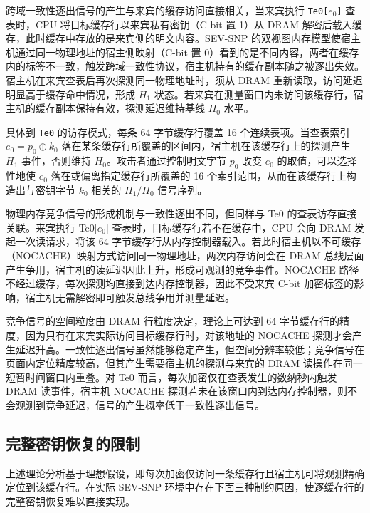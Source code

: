 跨域一致性逐出信号的产生与来宾的缓存访问直接相关，当来宾执行 \texttt{Te0[$e_0$]} 查表时，CPU 将目标缓存行以来宾私有密钥（C-bit 置 1）从 DRAM 解密后载入缓存，此时缓存中存放的是来宾侧的明文内容。SEV-SNP 的双视图内存模型使宿主机通过同一物理地址的宿主侧映射（C-bit 置 0）看到的是不同内容，两者在缓存内的标签不一致，触发跨域一致性协议，宿主机持有的缓存副本随之被逐出失效。宿主机在来宾查表后再次探测同一物理地址时，须从 DRAM 重新读取，访问延迟明显高于缓存命中情况，形成 $H_1$ 状态。若来宾在测量窗口内未访问该缓存行，宿主机的缓存副本保持有效，探测延迟维持基线 $H_0$ 水平。

具体到 \texttt{Te0} 的访存模式，每条 64 字节缓存行覆盖 16 个连续表项。当查表索引 $e_0 = p_0 \oplus k_0$ 落在某条缓存行所覆盖的区间内，宿主机在该缓存行上的探测产生 $H_1$ 事件，否则维持 $H_0$。攻击者通过控制明文字节 $p_0$ 改变 $e_0$ 的取值，可以选择性地使 $e_0$ 落在或偏离指定缓存行所覆盖的 16 个索引范围，从而在该缓存行上构造出与密钥字节 $k_0$ 相关的 $H_1/H_0$ 信号序列。

物理内存竞争信号的形成机制与一致性逐出不同，但同样与 Te0 的查表访存直接关联。来宾执行 Te0[$e_0$] 查表时，目标缓存行若不在缓存中，CPU 会向 DRAM 发起一次读请求，将该 64 字节缓存行从内存控制器载入。若此时宿主机以不可缓存（NOCACHE）映射方式访问同一物理地址，两次内存访问会在 DRAM 总线层面产生争用，宿主机的读延迟因此上升，形成可观测的竞争事件。NOCACHE 路径不经过缓存，每次探测均直接到达内存控制器，因此不受来宾 C-bit 加密标签的影响，宿主机无需解密即可触发总线争用并测量延迟。

竞争信号的空间粒度由 DRAM 行粒度决定，理论上可达到 64 字节缓存行的精度，因为只有在来宾实际访问目标缓存行时，对该地址的 NOCACHE 探测才会产生延迟升高。一致性逐出信号虽然能够稳定产生，但空间分辨率较低；竞争信号在页面内定位精度较高，但其产生需要宿主机的探测与来宾的 DRAM 读操作在同一短暂时间窗口内重叠。对 Te0 而言，每次加密仅在查表发生的数纳秒内触发 DRAM 读事件，宿主机 NOCACHE 探测若未在该窗口内到达内存控制器，则不会观测到竞争延迟，信号的产生概率低于一致性逐出信号。

\subsection{完整密钥恢复的限制}
\label{subsec:attack_limits}

上述理论分析基于理想假设，即每次加密仅访问一条缓存行且宿主机可将观测精确定位到该缓存行。在实际 SEV-SNP 环境中存在下面三种制约原因，使逐缓存行的完整密钥恢复难以直接实现。

